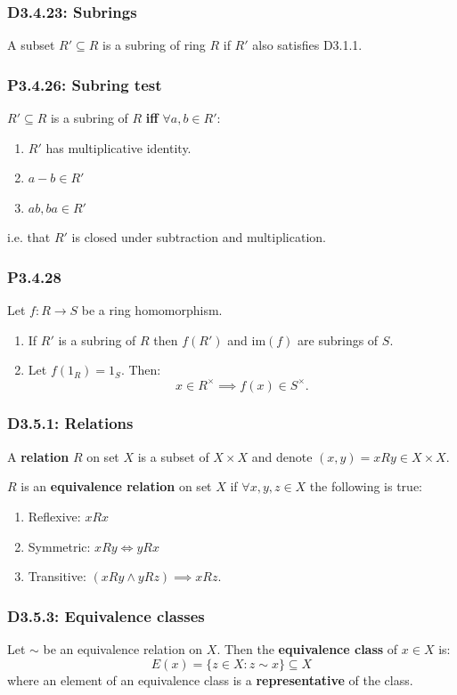 \documentclass{article}
\begin{document}
\begin{multicols*}{3}
\subsubsection*{D3.4.23: Subrings}
A subset $R'\subseteq R$ is a subring of ring $R$ if
$R'$ also satisfies D3.1.1.

\subsubsection*{P3.4.26: Subring test}
$R'\subseteq R$ is a subring of $R$ \textbf{if{}f}
$\forall a,b\in R'$:
\begin{enumerate}
    \item $R'$ has multiplicative identity.
    \item $a-b\in R'$
    \item $ab,ba\in R'$
\end{enumerate}
i.e. that $R'$ is closed under subtraction
and multiplication.

\subsubsection*{P3.4.28}
Let $f:R\rightarrow S$ be a ring homomorphism.
\begin{enumerate}
    \item If $R'$ is a subring of $R$ then
    $f(R')$ and $\text{im}(f)$ are subrings of $S$.

    \item Let $f(1_R)=1_S$. Then:
    $$x\in R^{\times}\implies f(x)\in S^{\times}.$$
\end{enumerate}

\subsubsection*{D3.5.1: Relations}
A \textbf{relation} $R$ on set $X$ is a subset of $X\times X$
and denote $(x,y)=xRy\in X\times X$.

$R$ is an \textbf{equivalence relation} on set $X$
if $\forall x,y,z\in X$ the following is true:
\begin{enumerate}
    \item Reflexive: $xRx$
    \item Symmetric: $xRy\iff yRx$
    \item Transitive: $(xRy\land yRz)\implies xRz$.
\end{enumerate}

\subsubsection*{D3.5.3: Equivalence classes}
Let $\sim$ be an equivalence relation on $X$.
Then the \textbf{equivalence class} of $x\in X$ is:
$$E(x)=\{z\in X:z\sim x\}\subseteq X$$
where an element of an equivalence class is 
a \textbf{representative} of the class.


\end{multicols*}
\end{document}
